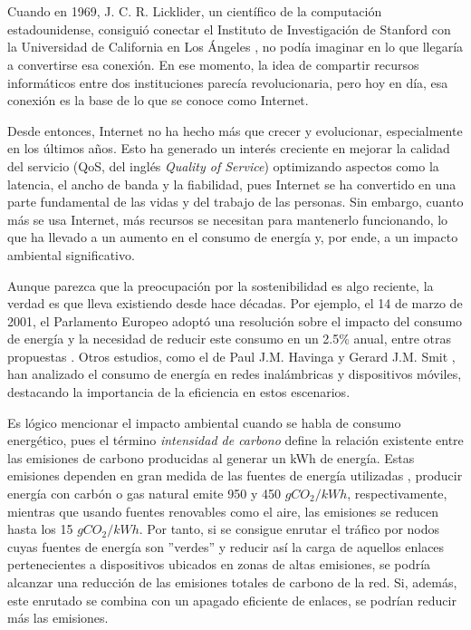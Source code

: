 \chapter{\introductionname}\label{chp:introduction}

Cuando en 1969, J. C. R. Licklider, un científico de la computación estadounidense, consiguió conectar el Instituto de Investigación de Stanford con la Universidad de California en Los Ángeles \cite{Rajaraman2022}, no podía imaginar en lo que llegaría a convertirse esa conexión. En ese momento, la idea de compartir recursos informáticos entre dos instituciones parecía revolucionaria, pero hoy en día, esa conexión es la base de lo que se conoce como Internet.

Desde entonces, Internet no ha hecho más que crecer y evolucionar, especialmente en los últimos años. Esto ha generado un interés creciente en mejorar la calidad del servicio (QoS, del inglés \textit{Quality of Service}) optimizando aspectos como la latencia, el ancho de banda y la fiabilidad, pues Internet se ha convertido en una parte fundamental de las vidas y del trabajo de las personas. Sin embargo, cuanto más se usa Internet, más recursos se necesitan para mantenerlo funcionando, lo que ha llevado a un aumento en el consumo de energía y, por ende, a un impacto ambiental significativo.

Aunque parezca que la preocupación por la sostenibilidad es algo reciente, la verdad es que lleva existiendo desde hace décadas. Por ejemplo, el 14 de marzo de 2001, el Parlamento Europeo adoptó una resolución sobre el impacto del consumo de energía y la necesidad de reducir este consumo en un 2.5\% anual, entre otras propuestas \cite{EuroparlTA52001141}. Otros estudios, como el de Paul J.M. Havinga y Gerard J.M. Smit \cite{Havinga2001}, han analizado el consumo de energía en redes inalámbricas y dispositivos móviles, destacando la importancia de la eficiencia en estos escenarios.

Es lógico mencionar el impacto ambiental cuando se habla de consumo energético, pues el término \textit{intensidad de carbono} define la relación existente entre las emisiones de carbono producidas al generar un kWh de energía. Estas emisiones dependen en gran medida de las fuentes de energía utilizadas \cite{GomezdelaHiz2025}, producir energía con carbón o gas natural emite 950 y 450 $gCO_2/kWh$, respectivamente, mientras que usando fuentes renovables como el aire, las emisiones se reducen hasta los 15 $gCO_2/kWh$. Por tanto, si se consigue enrutar el tráfico por nodos cuyas fuentes de energía son ''verdes'' y reducir así la carga de aquellos enlaces pertenecientes a dispositivos ubicados en zonas de altas emisiones, se podría alcanzar una reducción de las emisiones totales de carbono de la red. Si, además, este enrutado se combina con un apagado eficiente de enlaces, se podrían reducir más las emisiones.

